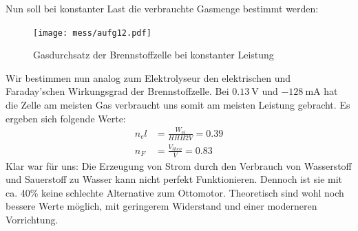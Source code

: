 Nun soll bei konstanter Last die verbrauchte Gasmenge bestimmt werden:
\begin{figure}[htbp]
	\centering
	\texttt{[image: mess/aufg12.pdf]}
	\caption{Gasdurchsatz der Brennstoffzelle bei konstanter Leistung}
	\label{a12}
\end{figure}
Wir bestimmen nun analog zum Elektrolyseur den elektrischen und Faraday’schen Wirkungsgrad der Brennstoffzelle.
Bei $\SI{0.13}{\volt}$ und $\SI{-128}{\milli \ampere}$ hat die Zelle am meisten Gas verbraucht uns somit am meisten Leistung gebracht. Es ergeben sich folgende Werte:
\begin{align*}
n_el &= \frac{W_{el}}{HHH2V}=0.39 \\
n_F &= \frac{V_{theo}}{V}=0.83
\end{align*}
Klar war für uns: Die Erzeugung von Strom durch den Verbrauch von Wasserstoff und Sauerstoff zu Wasser kann nicht perfekt Funktionieren.
Dennoch ist sie mit ca. 40\% keine schlechte Alternative zum Ottomotor.
Theoretisch sind wohl noch bessere Werte möglich, mit geringerem Widerstand und einer moderneren Vorrichtung.
